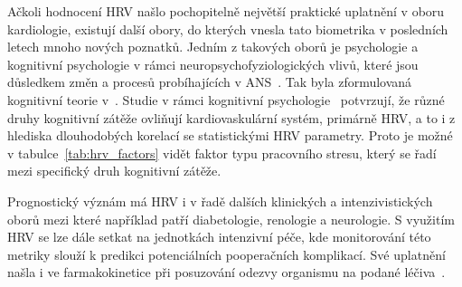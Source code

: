 Ačkoli hodnocení HRV našlo pochopitelně největší praktické uplatnění v oboru
kardiologie, existují další obory, do kterých vnesla tato biometrika v
posledních letech mnoho nových poznatků. Jedním z takových oborů je psychologie
a kognitivní psychologie v rámci neuropsychofyziologických vlivů, které jsou
důsledkem změn a procesů probíhajících v ANS~\cite{Bernardi2009}. Tak byla
zformulovaná kognitivní teorie v~\cite{Forte2019,Plass2010}. Studie v rámci
kognitivní
psychologie~\cite{Bernardi2009,Solhjoo2019,Salahuddin2007,Ishaque2020}
potvrzují, že různé druhy kognitivní zátěže ovliňují kardiovaskulární systém,
primárně HRV, a to i z hlediska dlouhodobých korelací se statistickými HRV
parametry. Proto je možné v tabulce~\ref{tab:hrv_factors} vidět faktor typu
pracovního stresu, který se řadí mezi specifický druh kognitivní zátěže.

Prognostický význám má HRV i v řadě dalších klinických a intenzivistických oborů
mezi které například patří diabetologie, renologie a neurologie. S využitím HRV
se lze dále setkat na jednotkách intenzivní péče, kde monitorování této metriky
slouží k predikci potenciálních pooperačních komplikací. Své uplatnění našla i
ve farmakokinetice při posuzování odezvy organismu na podané
léčiva~\cite{Pumprla2014}.


